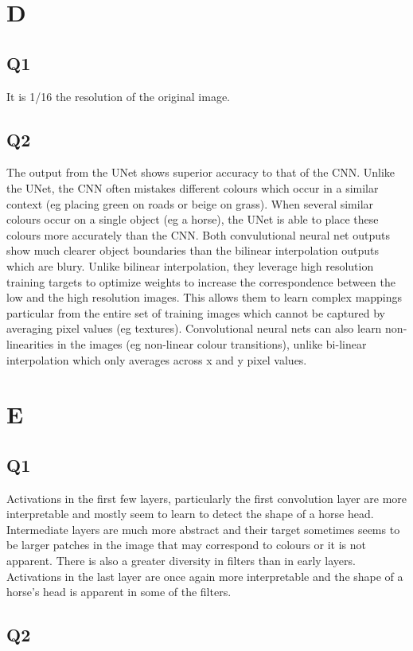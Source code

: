 \documentclass[12pt,letterpaper]{article} %
\begin{document}
\section{D}
\subsection{Q1}
It is 1/16 the resolution of the original image.

\subsection{Q2}
The output from the UNet shows superior accuracy to that of the CNN. Unlike the UNet, the CNN often mistakes different colours which occur in a similar context (eg placing green on roads or beige on grass). When several similar colours occur on a single object (eg a horse), the UNet is able to place these colours more accurately than the CNN. Both convulutional neural net outputs show much clearer object boundaries than the bilinear interpolation outputs which are blury. Unlike bilinear interpolation, they leverage high resolution training targets to optimize weights to increase the correspondence between the low and the high resolution images. This allows them to learn complex mappings particular from the entire set of training images which cannot be captured by averaging pixel values (eg textures). Convolutional neural nets can also learn non-linearities in the images (eg non-linear colour transitions), unlike bi-linear interpolation which only averages across x and y pixel values. 

\section{E}
\subsection{Q1}
Activations in the first few layers, particularly the first convolution layer are more interpretable and mostly seem to learn to detect the shape of a horse head. Intermediate layers are much more abstract and their target sometimes seems to be larger patches in the image that may correspond to colours or it is not apparent. There is also a greater diversity in filters than in early layers. Activations in the last layer are once again more interpretable and the shape of a horse's head is apparent in some of the filters.
\subsection{Q2}
\end{document}
